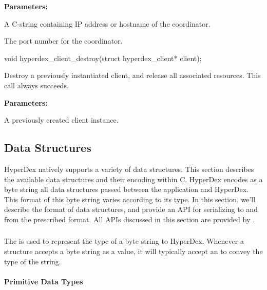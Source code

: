 \textbf{Parameters:}
\begin{description}[labelindent=\widthof{{\code{coordinator}}},leftmargin=*,noitemsep,nolistsep,align=right]
\item[\code{coordinator}] A C-string containing IP address or hostname of the
    coordinator.
\item[\code{port}] The port number for the coordinator.
\end{description}

\begin{ccode}
void
hyperdex_client_destroy(struct hyperdex_client* client);
\end{ccode}
Destroy a previously instantiated client, and release all associated
resources.  This call always succeeds.

\textbf{Parameters:}
\begin{description}[labelindent=\widthof{{\code{client}}},leftmargin=*,noitemsep,nolistsep,align=right]
\item[\code{client}] A previously created client instance.
\end{description}

\subsection{Data Structures}
\label{sec:api:c:client:data-structures}

HyperDex natively supports a variety of data structures.  This section describes
the available data structures and their encoding within C.  HyperDex encodes as
a byte string all data structures passed between the application and HyperDex.
This format of this byte string varies according to its type.  In this section,
we'll describe the format of data structures, and provide an API for serializing
to and from the prescribed format.  All APIs discussed in this section are
provided by .

\subsubsection{}
\label{sec:api:c:client:hyperdatatype}

The  is used to represent the type of a byte string to
HyperDex.  Whenever a structure accepts a byte string as a value, it will
typically accept an  to convey the type of the string.

\paragraph{Primitive Data Types}

